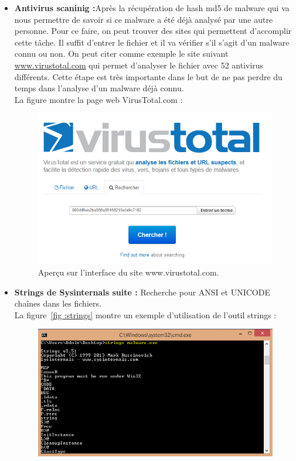 \begin{itemize}
\begin{figure}[H]
\begin{center}
\end{center}
\end{figure}
\item \textbf{Antivirus scaninig :}Après la récupération de hash md5 de malware qui va nous permettre de savoir si ce malware a été déjà analysé par une autre personne. Pour ce
faire, on peut trouver des sites qui permettent d'accomplir cette tâche. Il suffit d'entrer le fichier et il va vérifier s'il s'agit d'un malware connu ou non. On peut citer comme exemple le site suivant \url{www.virustotal.com} qui permet d'analyser le fichier avec 52 antivirus différents. Cette étape est très importante dans le but de ne pas perdre du temps dans l'analyse d'un malware déjà connu.\\
La figure montre la page web VirusTotal.com :
\begin{figure}[H]
\begin{center}
\includegraphics[scale=0.5]{Figures/vit.png}
\caption{Aperçu sur l'interface du site www.virustotal.com.}
\label{fig :vit} 
\end{center}
\end{figure}
\item \textbf{Strings de Sysinternals suite : }Recherche pour ANSI et UNICODE chaînes dans les fichiers.\\
La figure~\ref{fig :strings} montre un exemple d'utilisation de l'outil strings :
\begin{figure}[H]
\begin{center}
\includegraphics[scale=0.7]{Figures/strings.png}

\end{center}
\end{figure}
\end{itemize}
